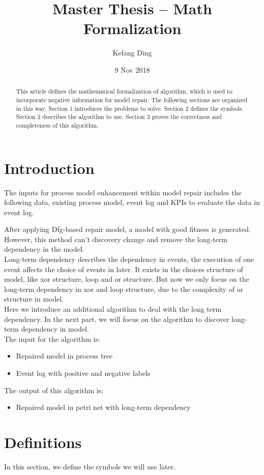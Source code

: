 \documentclass[]{article}
\title{Master Thesis --  Math Formalization}
\author{Kefang Ding}
\date{9 Nov 2018}
\begin{document}
\maketitle

\hrulefill
\hrulefill 

\begin{abstract}
This article defines the mathematical formalization of algorithm, which is used to incorporate negative information for model repair. The following sections are organized in this way. Section 1 introduces the  problems to solve. Section 2 defines the symbols. Section 2 describes the algorithm to use. Section 3 proves the correctness and completeness of this algorithm. 
\end{abstract}

\section{Introduction}
The inputs for process model enhancement within model repair includes the following data, existing process model, event log and KPIs to evaluate the data in event log. 

After applying Dfg-based repair model, a model with good fitness is generated. However, this method can't discovery  change and remove the long-term dependency in the model. \\
Long-term dependency describes the dependency in events, the execution of one event affects the choice of events in later. It exists in the choices structure of model, like xor structure, loop and or structure. But now we only focus on the long-term dependency in xor and loop structure, due to the complexity of or structure in model. \\
Here we introduce an additional algorithm to deal with the long term dependency. In the next part, we will focus on the algorithm to discover long-term dependency in model. \\
The input for the algorithm is:
\begin{itemize}
	\item Repaired model in process tree
	\item Event log with positive and negative labels
\end{itemize}
The output of this algorithm is: 
\begin{itemize}
	\item Repaired model in petri net with long-term dependency
\end{itemize}

\section{Definitions}
In this section, we define the symbols we will use later. 
\end{document}
